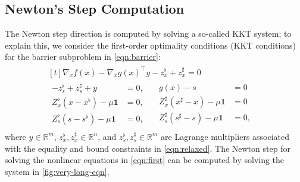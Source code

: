 \documentclass{IEEEtran4PSCC} %
\begin{document}
\subsection{Newton's Step Computation}
The Newton step direction is computed by solving a so-called KKT system; to explain this, we consider the first-order optimality conditions (KKT conditions) for the barrier subproblem in \eqref{eqn:barrier}:
\begin{align}\label{eqn:first}
  \begin{aligned}[t]
    \nabla_{x} f(x) - \nabla_{x}g(x)^\top y  - z_x^\flat  + z_x^\sharp = 0\;&\\
    \begin{aligned}
      - z_s^\flat  + z_s^\sharp + y &= 0,\\
      Z^\flat_x (x-x^\flat) - \mu\boldsymbol{1} &= 0,\\
      Z^\flat_s (s-s^\flat) - \mu\boldsymbol{1}&= 0,
    \end{aligned}
    \quad
    \begin{aligned}
      g(x) - s  &= 0\\
      Z^\sharp_x (x^\sharp-x) - \mu\boldsymbol{1}&= 0\\
      Z^\sharp_s (s^\sharp-s) - \mu\boldsymbol{1}&= 0,
    \end{aligned}&
  \end{aligned}
\end{align}
where $y\in\mathbb{R}^{m}$, $z_x^\flat,z_x^\sharp\in\mathbb{R}^{n}$,
and $z_s^\flat,z_s^\sharp\in\mathbb{R}^{m}$ are Lagrange multipliers
associated with the equality and bound constraints in
\eqref{eqn:relaxed}. The Newton step for solving the nonlinear
equations in \eqref{eqn:first} can be computed by solving the system in \eqref{fig:very-long-eqn}.
\end{document}
